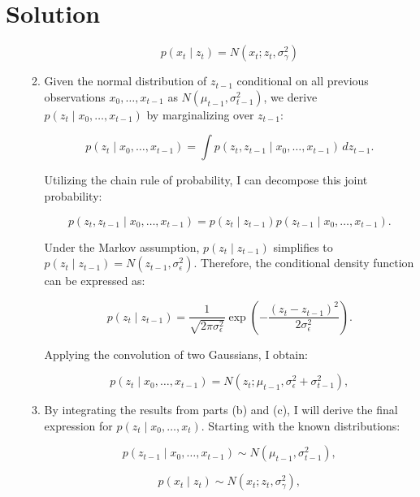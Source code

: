 \documentclass[submit]{harvardml}
\newenvironment{solution}
  {\color{blue}\section*{Solution}}
{}
\begin{document}
\begin{solution}
\begin{enumerate}
\begin{enumerate}
\begin{equation*}
p(x_t \mid z_t) = N(x_t; z_t, \sigma_{\gamma}^2)
\end{equation*}

    \item  Given the normal distribution of \( z_{t-1} \) conditional on all previous observations \( x_0, \ldots, x_{t-1} \) as \( N(\mu_{t-1}, \sigma_{t-1}^2) \), we derive \( p(z_t \mid x_0, \ldots, x_{t-1}) \) by marginalizing over \( z_{t-1} \):

\begin{equation*}
p(z_t \mid x_0, \ldots, x_{t-1}) = \int p(z_t, z_{t-1} \mid x_0, \ldots, x_{t-1}) \, dz_{t-1}.
\end{equation*}

Utilizing the chain rule of probability, I can decompose this joint probability:

\begin{equation*}
p(z_t, z_{t-1} \mid x_0, \ldots, x_{t-1}) = p(z_t \mid z_{t-1}) p(z_{t-1} \mid x_0, \ldots, x_{t-1}).
\end{equation*}

Under the Markov assumption, \( p(z_t \mid z_{t-1}) \) simplifies to \( p(z_t \mid z_{t-1}) = N(z_{t-1}, \sigma_{\epsilon}^2) \). Therefore, the conditional density function can be expressed as:

\begin{equation*}
p(z_t \mid z_{t-1}) = \frac{1}{\sqrt{2 \pi \sigma_{\epsilon}^2}} \exp\left(-\frac{(z_t - z_{t-1})^2}{2\sigma_{\epsilon}^2}\right).
\end{equation*}

Applying the convolution of two Gaussians, I obtain:

\begin{equation*}
p(z_t \mid x_0, \ldots, x_{t-1}) = N(z_t; \mu_{t-1}, \sigma_{\epsilon}^2 + \sigma_{t-1}^2),
\end{equation*}


\item By integrating the results from parts (b) and (c), I will derive the final expression for \( p(z_t \mid x_0, \ldots, x_t) \). Starting with the known distributions:

\begin{equation*}
p(z_{t-1} \mid x_0, \ldots, x_{t-1}) \sim N(\mu_{t-1}, \sigma_{t-1}^2),
\end{equation*}

\begin{equation*}
p(x_t \mid z_t) \sim N(x_t; z_t, \sigma_{\gamma}^2),
\end{equation*}


\end{enumerate}
\end{enumerate}
\end{solution}
\end{document}
